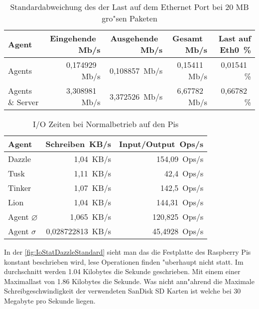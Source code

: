 \begin{table}
\centering
\begin{tabular}{l%
 r<{\,Mb/s}%
 r<{\,Mb/s}%
 r<{\,Mb/s}%
 r<{\,\%}%
}
Agent		& Eingehende            & Ausgehende            & Gesamt                & Last auf Eth0	 \\
\hline
Agents		& 0,174929              & 0,108857              & 0,15411               &  0,01541    	 \\
Agents \& Server& 3,308981		& 3,372526        	& 6,67782             	&  0,66782   	 \\
\end{tabular}
\caption{Standardabweichung des der Last auf dem Ethernet Port bei 20 MB gro"sen Paketen }
\label{tab:standardTrafficAbweichung}
\end{table}

\begin{table}
\centering
\begin{tabular}{l%
 r<{\,KB/s}%
 r<{\,Ops/s}%
}
Agent	  			& Schreiben	 	& Input/Output 	\\	
\hline
Dazzle 				& 1,04			& 154,09	        \\
Tusk 				& 1,11			& 42,4			\\
Tinker				& 1,07 			& 142,5		 	\\
Lion				& 1,04			& 144,31	 	\\
Agent $\diameter $  		& 1,065			& 120,825		\\   
Agent $\sigma $ 		& 0,028722813  		& 45,4928		\\
\end{tabular}
\caption{I/O Zeiten bei Normalbetrieb auf den Pis}
\label{tab:NormalbetriebIoStat}
\end{table}


In der \cref{fig:IoStatDazzleStandard} sieht man das die Festplatte des Raspberry Pis konstant beschrieben wird, lese Operationen finden "uberhaupt nicht statt. %
Im durchschnitt werden 1.04 Kilobytes die Sekunde geschrieben. Mit einem einer Maximallast von 1.86 Kilobytes die Sekunde. %
Was nicht ann"ahrend die Maximale Schreibgeschwindigkeit der verwendeten %
SanDisk SD Karten ist welche bei 30 Megabyte pro Sekunde \autocite{san:sd}  liegen. 

